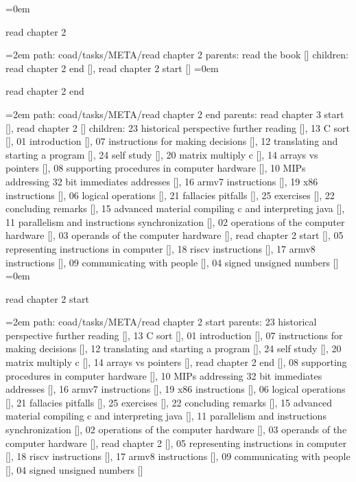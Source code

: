 \smallskip
\leftskip=0em
\par\endgroup
\bigskip
{}
read chapter 2
\smallskip
\par\begingroup
\leftskip=2em
path: coad/tasks/META/read chapter 2
\smallskip
parents:  read the book []
\smallskip
children: read chapter 2 end [], read chapter 2 start []
\smallskip
\leftskip=0em
\par\endgroup
\bigskip
{}
read chapter 2 end
\smallskip
\par\begingroup
\leftskip=2em
path: coad/tasks/META/read chapter 2 end
\smallskip
parents:  read chapter 3 start [], read chapter 2 []
\smallskip
children: 23 historical perspective further reading [], 13 C sort [], 01 introduction [], 07 instructions for making decisions [], 12 translating and starting a program [], 24 self study [], 20 matrix multiply c [], 14 arrays vs pointers [], 08 supporting procedures in computer hardware [], 10 MIPs addressing 32 bit immediates addresses [], 16 armv7 instructions [], 19 x86 instructions [], 06 logical operations [], 21 fallacies pitfalls [], 25 exercises [], 22 concluding remarks [], 15 advanced material compiling c and interpreting java [], 11 parallelism and instructions synchronization [], 02 operations of the computer hardware [], 03 operands of the computer hardware [], read chapter 2 start [], 05 representing instructions in computer [], 18 riscv instructions [], 17 armv8 instructions [], 09 communicating with people [], 04 signed unsigned numbers []
\smallskip
\leftskip=0em
\par\endgroup
\bigskip
{}
read chapter 2 start
\smallskip
\par\begingroup
\leftskip=2em
path: coad/tasks/META/read chapter 2 start
\smallskip
parents:  23 historical perspective further reading [], 13 C sort [], 01 introduction [], 07 instructions for making decisions [], 12 translating and starting a program [], 24 self study [], 20 matrix multiply c [], 14 arrays vs pointers [], read chapter 2 end [], 08 supporting procedures in computer hardware [], 10 MIPs addressing 32 bit immediates addresses [], 16 armv7 instructions [], 19 x86 instructions [], 06 logical operations [], 21 fallacies pitfalls [], 25 exercises [], 22 concluding remarks [], 15 advanced material compiling c and interpreting java [], 11 parallelism and instructions synchronization [], 02 operations of the computer hardware [], 03 operands of the computer hardware [], read chapter 2 [], 05 representing instructions in computer [], 18 riscv instructions [], 17 armv8 instructions [], 09 communicating with people [], 04 signed unsigned numbers []
